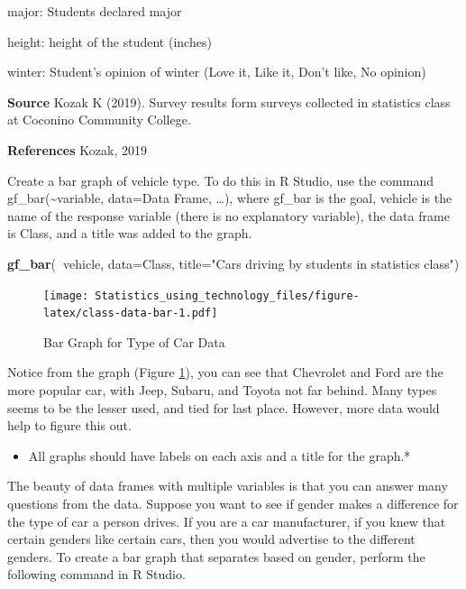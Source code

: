 \documentclass[]{book}
\newenvironment{Shaded}{\begin{snugshade}}{\end{snugshade}}
\newcommand{\DataTypeTok}[1]{\textcolor[rgb]{0.13,0.29,0.53}{#1}}
\newcommand{\KeywordTok}[1]{\textcolor[rgb]{0.13,0.29,0.53}{\textbf{#1}}}
\newcommand{\NormalTok}[1]{#1}
\newcommand{\OperatorTok}[1]{\textcolor[rgb]{0.81,0.36,0.00}{\textbf{#1}}}
\newcommand{\StringTok}[1]{\textcolor[rgb]{0.31,0.60,0.02}{#1}}
\providecommand{\tightlist}{%
  \setlength{\itemsep}{0pt}\setlength{\parskip}{0pt}}
\begin{document}
major: Students declared major

height: height of the student (inches)

winter: Student's opinion of winter (Love it, Like it, Don't like, No opinion)

\textbf{Source}
Kozak K (2019). Survey results form surveys collected in statistics class at Coconino Community College.

\textbf{References}
Kozak, 2019

Create a bar graph of vehicle type. To do this in R Studio, use the command gf\_bar(\textasciitilde{}variable, data=Data Frame, \ldots{}), where gf\_bar is the goal, vehicle is the name of the response variable (there is no explanatory variable), the data frame is Class, and a title was added to the graph.



\begin{Shaded}
\begin{Highlighting}[]
\KeywordTok{gf_bar}\NormalTok{(}\OperatorTok{~}\NormalTok{vehicle, }\DataTypeTok{data=}\NormalTok{Class, }\DataTypeTok{title=}\StringTok{"Cars driving by students in statistics class"}\NormalTok{)}
\end{Highlighting}
\end{Shaded}

\begin{figure}
\centering
\texttt{[image: Statistics\_using\_technology\_files/figure-latex/class-data-bar-1.pdf]}
\caption{\label{fig:class-data-bar}Bar Graph for Type of Car Data}
\end{figure}

Notice from the graph (Figure \ref{fig:class-data-bar}), you can see that Chevrolet and Ford are the more popular car, with Jeep, Subaru, and Toyota not far behind. Many types seems to be the lesser used, and tied for last place. However, more data would help to figure this out.

\begin{itemize}
\tightlist
\item
  All graphs should have labels on each axis and a title for the graph.*
\end{itemize}

The beauty of data frames with multiple variables is that you can answer many questions from the data. Suppose you want to see if gender makes a difference for the type of car a person drives. If you are a car manufacturer, if you knew that certain genders like certain cars, then you would advertise to the different genders. To create a bar graph that separates based on gender, perform the following command in R Studio.
\end{document}
